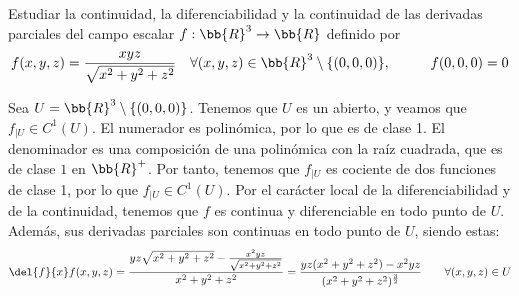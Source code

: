 \begin{ejercicio}
    Estudiar la continuidad, la diferenciabilidad y la continuidad de las derivadas parciales del campo escalar $f: \bb{R}^3 \to \bb{R}$ definido por
    \begin{equation*}
        f(x,y,z)= \frac{xyz}{\sqrt{x^2 + y^2 + z^2}} \quad \forall (x,y,z) \in \bb{R}^3\setminus\{(0,0, 0)\}, \hspace{1cm}   f(0,0, 0) = 0
    \end{equation*}

    Sea $U=\bb{R}^3\setminus \{(0,0,0)\}$. Tenemos que $U$ es un abierto, y veamos que $f_{\big| U}\in C^1({U})$. El numerador es polinómica, por lo que es de clase 1. El denominador es una composición de una polinómica con la raíz cuadrada, que es de clase $1$ en $\bb{R}^+$. Por tanto, tenemos que $f_{\big| U}$ es cociente de dos funciones de clase 1, por lo que $f_{\big| U}\in C^1({U})$. Por el carácter local de la diferenciabilidad y de la continuidad, tenemos que $f$ es continua y diferenciable en todo punto de $U$. Además, sus derivadas parciales son continuas en todo punto de $U$, siendo estas:
    \begin{equation*}
        \del{f}{x}f(x,y,z) = \frac{yz\sqrt{x^2+y^2+z^2} - \frac{x^2yz}{\sqrt{x^2+y^2+z^2}}}{x^2+y^2+z^2}
        = \frac{yz(x^2+y^2+z^2) - x^2yz}{(x^2+y^2+z^2)^{\frac{3}{2}}} \qquad \forall (x,y,z)\in U
    \end{equation*}


\end{ejercicio}
